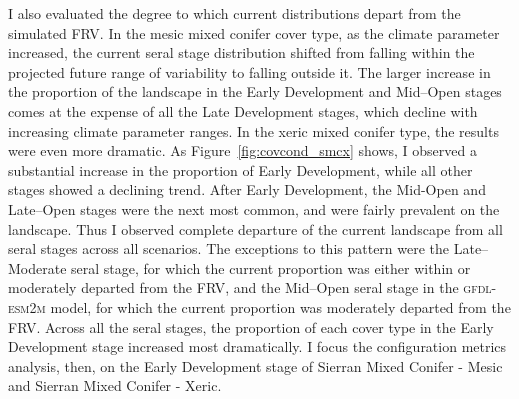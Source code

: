 I also evaluated the degree to which current distributions depart from the simulated FRV. 
%
In the mesic mixed conifer cover type, as the climate parameter increased, the current seral stage distribution shifted from falling within the projected future range of variability to falling outside it. The larger increase in the proportion of the landscape in the Early Development and Mid--Open stages comes at the expense of all the Late Development stages, which decline with increasing climate parameter ranges.
%
In the xeric mixed conifer type, the results were even more dramatic. As Figure~\ref{fig:covcond_smcx} shows, I observed a substantial increase in the proportion of Early Development, while all other stages showed a declining trend. After Early Development, the Mid-Open and Late--Open stages were the next most common, and were fairly prevalent on the landscape. Thus I observed complete departure of the current landscape from all seral stages across all scenarios. The exceptions to this pattern were the Late--Moderate seral stage, for which the current proportion was either within or moderately departed from the FRV, and the Mid--Open seral stage in the \textsc{gfdl-esm2m} model, for which the current proportion was moderately departed from the FRV. 
%
Across all the seral stages, the proportion of each cover type in the Early Development stage increased most dramatically. I focus the configuration metrics analysis, then, on the Early Development stage of Sierran Mixed Conifer - Mesic and Sierran Mixed Conifer - Xeric.

